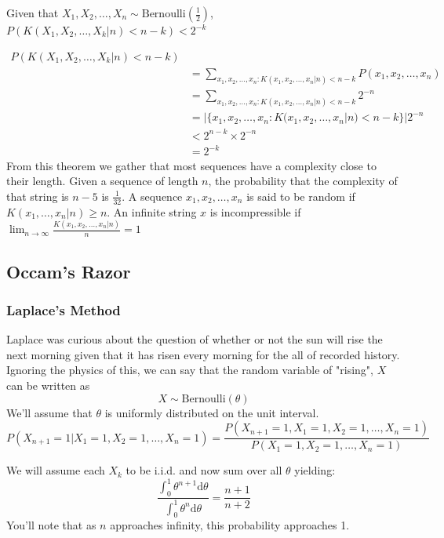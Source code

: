 \documentclass[11pt]{article}
\theoremstyle{definition}
\begin{document}
\theorem Given that $X_1, X_2, \dots, X_n \sim \mathrm{Bernoulli}(\frac 12)$, $P(K(X_1, X_2, \dots, X_k | n) < n - k) < 2^{-k}$
\proof 

\begin{align*}
	P(K(X_1, X_2, \dots, X_k | n) < n - k)\\
	&= \sum_{x_1, x_2, \dots, x_n : K(x_1, x_2,\dots, x_n | n) < n - k} P(x_1, x_2, \dots, x_n)\\
	&= \sum_{x_1, x_2, \dots, x_n : K(x_1, x_2,\dots, x_n | n) < n - k} 2^{-n}\\
	&= |\{x_1, x_2, \dots, x_n : K(x_1, x_2,\dots, x_n | n) < n - k\}| 2^{-n}\\
	&< 2^{n-k} \times 2^{-n}\\
	&= 2^{-k}
\end{align*}
From this theorem we gather that most sequences have a complexity close to their length.
\example Given a sequence of length $n$, the probability that the complexity of that string is $n - 5$ is $\frac{1}{32}$.
 A sequence $x_1, x_2, \dots, x_n$ is said to be random if $K(x_1,\dots, x_n | n) \geq n$.
 An infinite string $x$ is incompressible if $\displaystyle \lim_{n \to \infty} \frac{K(x_1, x_2,\dots, x_n|n)}{n} = 1$

\subsection{Occam's Razor}
\subsubsection{Laplace's Method}
Laplace was curious about the question of whether or not the sun will rise the next morning given that it has risen every morning for the all of recorded history. Ignoring the physics of this, we can say that the random variable of "rising", $X$ can be written as 
$$X \sim \mathrm{Bernoulli}(\theta)$$ 
We'll assume that $\theta$ is uniformly distributed on the unit interval.
$$P(X_{n+1} = 1 | X_1  = 1, X_2 = 1, \dots, X_n = 1) = \frac{P(X_{n+1} = 1, X_1  = 1, X_2 = 1, \dots, X_n = 1)}{P(X_1  = 1, X_2 = 1, \dots, X_n = 1)}$$

We will assume each $X_k$ to be i.i.d. and now sum over all $\theta$ yielding:
$$\frac{\displaystyle \int_0^1 \theta^{n + 1} \mathrm{d}\theta}{\displaystyle \int_0^1 \theta^{n} \mathrm{d}\theta} = \frac{n+1}{n+2}$$
You'll note that as $n$ approaches infinity, this probability approaches 1.
\end{document}
